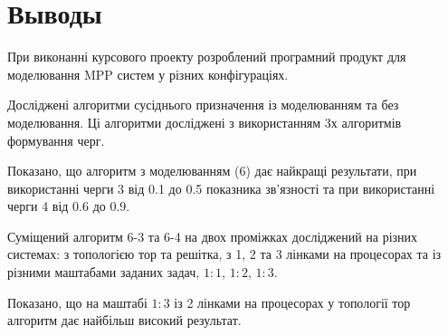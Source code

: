\section{Выводы}
    При виконанні курсового проекту розроблений програмний продукт для моделювання MPP систем у різних конфігураціях.

    Досліджені алгоритми сусіднього призначення із моделюванням та без моделювання. Ці алгоритми досліджені з використанням 3х алгоритмів формування черг.

    Показано, що алгоритм з моделюванням (6) дає найкращі результати, при використанні черги 3 від 0.1 до 0.5 показника зв'язності та при використанні черги 4 від 0.6 до 0.9.

    Суміщений алгоритм 6-3 та 6-4 на двох проміжках досліджений на різних системах: з топологією тор та решітка, з 1, 2 та 3 лінками на процесорах та із різними маштабами заданих задач, $1:1$, $1:2$, $1:3$.

    Показано, що на маштабі $1:3$ із 2 лінками на процесорах у топології тор алгоритм дає найбільш високий результат.